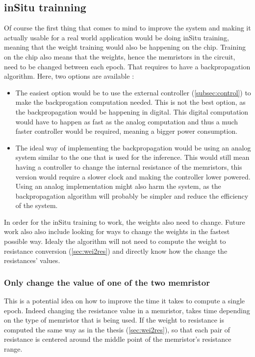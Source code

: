 \subsection{inSitu trainning}\label{subsec:inSitu}

Of course the first thing that comes to mind to improve the system and making it actually usable for a real world application would be doing inSitu training, meaning that the weight training would also be happening on the chip. Training on the chip also means that the weights, hence the memristors in the circuit, need to be changed between each epoch. That requires to have a backpropagation algorithm. Here, two options are available :

\begin{itemize}
  \item The easiest option would be to use the external controller (\cref{subsec:control}) to make the backprogation computation needed. This is not the best option, as the backpropagation would be happening in digital. This digital computation would have to happen as fast as the analog computation and thus a much faster controller would be required, meaning a bigger power consumption.
  \item The ideal way of implementing the backpropagation would be using an analog system similar to the one that is used for the inference. This would still mean having a controller to change the internal resistance of the memristors, this version would require a slower clock and making the controller lower powered. Using an analog implementation might also harm the system, as the backpropagation algorithm will probably be simpler and reduce the efficiency of the system.
\end{itemize}

In order for the inSitu training to work, the weights also need to change. Future work also also include looking for ways to change the weights in the fastest possible way. Idealy the algorithm will not need to compute the weight to resistance conversion (\cref{sec:wei2res}) and directly know how the change the resistances' values.

\subsubsection{Only change the value of one of the two memristor}

This is a potential idea on how to improve the time it takes to compute a single epoch. Indeed changing the resistance value in a memristor, takes time depending on the type of memristor that is being used. If the weight to resistance is computed the same way as in the thesis (\cref{sec:wei2res}), so that each pair of resistance is centered around the middle point of the memristor's resistance range.

